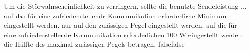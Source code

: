     {Um die Störwahrscheinlichkeit zu verringern, sollte die benutzte Sendeleistung ...}
    {auf das für eine zufriedenstellende Kommunikation erforderliche Minimum eingestellt werden.}
    {nur auf den zulässigen Pegel eingestellt werden.}
    {auf die für eine zufriedenstellende Kommunikation erforderlichen 100 W eingestellt werden.}
    {die Hälfte des maximal zulässigen Pegels betragen.}
    {false}{false}